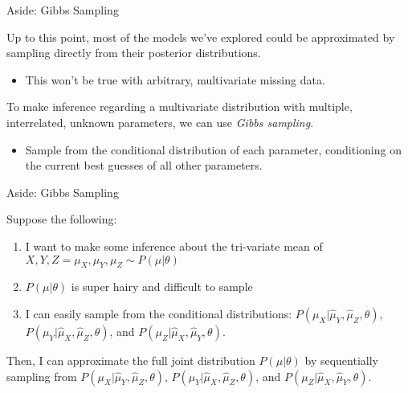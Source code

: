 \documentclass[10pt]{beamer}\usepackage[]{graphicx}\usepackage[]{color}
\begin{document}

\begin{frame}{Aside: Gibbs Sampling}
  
  Up to this point, most of the models we've explored could be approximated by 
  sampling directly from their posterior distributions.
  \vc
  \begin{itemize}
    \item This won't be true with arbitrary, multivariate missing data.
  \end{itemize}
  \va 
  To make inference regarding a multivariate distribution with multiple, 
  interrelated, unknown parameters, we can use \emph{Gibbs sampling}.
  \vc
  \begin{itemize}
  \item Sample from the conditional distribution of each parameter, conditioning 
    on the current best guesses of all other parameters.
  \end{itemize}
  
\end{frame}


\begin{frame}{Aside: Gibbs Sampling}
  
  Suppose the following:
  \vb
  \begin{enumerate}
  \item I want to make some inference about the tri-variate mean of
    $X, Y, Z = \mu_X, \mu_Y, \mu_Z \sim P(\mu | \theta)$
    \vb
  \item $P(\mu | \theta)$ is super hairy and difficult to sample
    \vb
  \item I can easily sample from the conditional distributions:
    $P(\mu_X | \hat{\mu}_Y, \hat{\mu}_Z, \theta)$,
    $P(\mu_Y | \hat{\mu}_X, \hat{\mu}_Z, \theta)$, and
    $P(\mu_Z | \hat{\mu}_X, \hat{\mu}_Y, \theta)$.
  \end{enumerate}
  \va
  Then, I can approximate the full joint distribution $P(\mu | \theta)$ by 
  sequentially sampling from
  $P(\mu_X | \hat{\mu}_Y, \hat{\mu}_Z, \theta)$, 
  $P(\mu_Y | \hat{\mu}_X, \hat{\mu}_Z, \theta)$, and 
  $P(\mu_Z | \hat{\mu}_X, \hat{\mu}_Y, \theta)$.

\end{frame}
  
\end{document}
